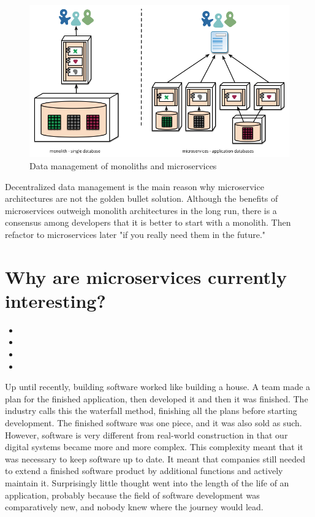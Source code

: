 \begin{figure}[ht]
  \centering
  \includegraphics[width=0.7\linewidth]{assets/decentralised-data.png}
  \caption{Data management of monoliths and microservices}
  \label{fig:decentralised-data}
\end{figure}

Decentralized data management is the main reason why microservice architectures are not the golden bullet solution. Although the benefits of microservices outweigh monolith architectures in the long run, there is a consensus among developers that it is better to start with a monolith. Then refactor to microservices later "if you really need them in the future." ~\cite{krivtsov.2019}


\section{Why are microservices currently interesting?}

\begin{itemize}
  \item {}
  \item {}
  \item {}
  \item {}
\end{itemize}

Up until recently, building software worked like building a house. A team made a plan for the finished application, then developed it and then it was finished. The industry calls this the waterfall method, finishing all the plans before starting development. The finished software was one piece, and it was also sold as such. However, software is very different from real-world construction in that our digital systems became more and more complex. This complexity meant that it was necessary to keep software up to date. It meant that companies still needed to extend a finished software product by additional functions and actively maintain it. Surprisingly little thought went into the length of the life of an application, probably because the field of software development was comparatively new, and nobody knew where the journey would lead.

